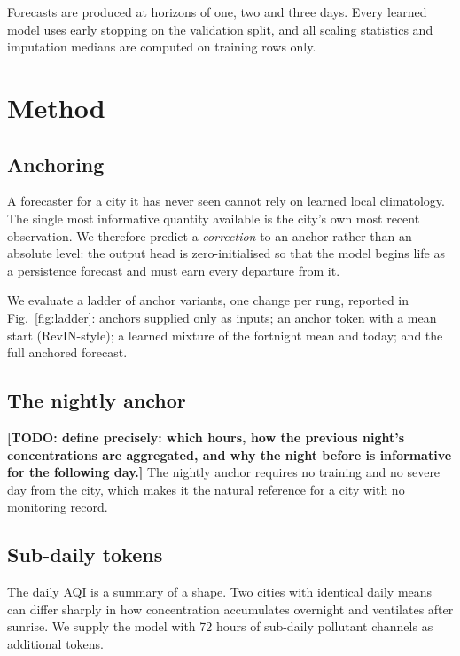 \documentclass[conference]{IEEEtran}
\newcommand{\todo}[1]{\textbf{[TODO: #1]}}
\begin{document}


Forecasts are produced at horizons of one, two and three days. Every learned model uses
early stopping on the validation split, and all scaling statistics and imputation
medians are computed on training rows only.

\section{Method}
\label{sec:method}

\subsection{Anchoring}

A forecaster for a city it has never seen cannot rely on learned local climatology. The
single most informative quantity available is the city's own most recent observation.
We therefore predict a \emph{correction} to an anchor rather than an absolute level:
the output head is zero-initialised so that the model begins life as a persistence
forecast and must earn every departure from it.

We evaluate a ladder of anchor variants, one change per rung, reported in
Fig.~\ref{fig:ladder}: anchors supplied only as inputs; an anchor token with a
mean start (RevIN-style); a learned mixture of the fortnight mean and today; and the
full anchored forecast.

\subsection{The nightly anchor}

\todo{define precisely: which hours, how the previous night's concentrations are
aggregated, and why the night before is informative for the following day.} The nightly
anchor requires no training and no severe day from the city, which makes it the natural
reference for a city with no monitoring record.

\subsection{Sub-daily tokens}

The daily AQI is a summary of a shape. Two cities with identical daily means can differ
sharply in how concentration accumulates overnight and ventilates after sunrise. We
supply the model with 72 hours of sub-daily pollutant channels as additional tokens.
\end{document}
